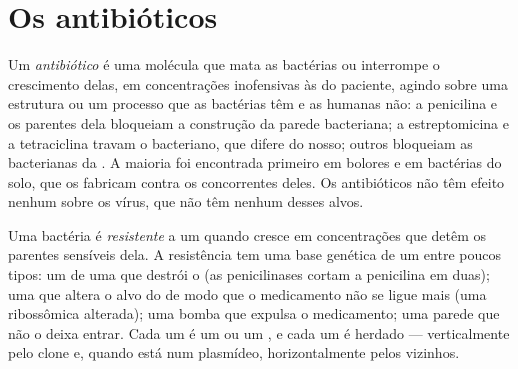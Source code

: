 \section{Os antibióticos}

\begin{definition}[Antibiótico]\label{def:g11:antibiotic-resistance:antibiotic}
Um \emph{antibiótico} é uma molécula que mata as
bactérias ou interrompe o crescimento delas, em concentrações
inofensivas às  do paciente, agindo sobre uma estrutura ou um
processo que as bactérias têm e as  humanas não: a penicilina e
os parentes dela bloqueiam a construção da parede bacteriana; a
estreptomicina e a tetraciclina travam o  bacteriano, que
difere do nosso; outros bloqueiam as  bacterianas da . A maioria foi encontrada primeiro em bolores e em bactérias do
solo, que os fabricam contra os concorrentes deles. Os antibióticos não
têm efeito nenhum sobre os vírus, que não têm nenhum desses alvos.
\end{definition}

\begin{proposition}\label{prop:g11:antibiotic-resistance:mechanisms}
Uma bactéria é \emph{resistente} a um
 quando cresce em concentrações que detêm os parentes
sensíveis dela. A resistência tem uma base genética de um entre poucos
tipos: um  de uma  que destrói o  (as
penicilinases cortam a penicilina em duas); uma  que altera o
alvo do  de modo que o medicamento não se ligue mais (uma
 ribossômica alterada); uma bomba que expulsa o medicamento;
uma parede que não o deixa entrar. Cada um é um  ou um , e
cada um é herdado --- verticalmente pelo clone e, quando está num
plasmídeo, horizontalmente pelos vizinhos.
\end{proposition}
\admitted

